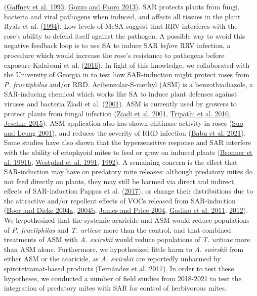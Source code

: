\documentclass{ufdissertation}[overrideChapters] %
\begin{document}
{(\protect\hyperlink{ref-Gaffney1993}{Gaffney et al. 1993}, \protect\hyperlink{ref-Gozzo2013}{Gozzo and Faoro 2013}). SAR protects plants from fungi, bacteria and viral pathogens when induced, and affects all tissues in the plant Ryals et al. (\protect\hyperlink{ref-Ryals1994}{1994}). Low levels of MeSA suggest that RRV interferes with the rose's ability to defend itself against the pathogen. A possible way to avoid this negative feedback loop is to use SA to induce SAR \emph{before} RRV infection, a procedure which would increase the rose's resistance to pathogens before exposure Kalaivani et al. (\protect\hyperlink{ref-Kalaivani2016}{2016}). In light of this knowledge, we collaborated with the University of Georgia in to test how SAR-induction might protect roses from \emph{P. fructiphilus} and/or RRD. Acibenzolar-S-methyl (ASM) is a benzothiadiazole, a SAR-inducing chemical which works like SA to induce plant defenses against viruses and bacteria Ziadi et al. (\protect\hyperlink{ref-Ziadi2001}{2001}). ASM is currently used by growers to protect plants from fungal infection (\protect\hyperlink{ref-Ziadi2001}{Ziadi et al. 2001}, \protect\hyperlink{ref-Tripathi2010}{Tripathi et al. 2010}, \protect\hyperlink{ref-Jeschke2015}{Jeschke 2015}). ASM application also has shown chitinase activity in roses (\protect\hyperlink{ref-Suo2001}{Suo and Leung 2001}), and reduces the severity of RRD infection (\protect\hyperlink{ref-Babu2021}{Babu et al. 2021}). Some studies have also shown that the hypersensitive response and SAR interfere with the ability of eriophyoid mites to feed or grow on induced plants (\protect\hyperlink{ref-Bronner1991a}{Bronner et al. 1991b}, \protect\hyperlink{ref-Westphal1991}{Westphal et al. 1991}, \protect\hyperlink{ref-Westphal1992}{1992}). A remaining concern is the effect that SAR-induction may have on predatory mite releases: although predatory mites do not feed directly on plants, they may still be harmed via direct and indirect effects of SAR-induction Pappas et al. (\protect\hyperlink{ref-Pappas2017}{2017}), or change their distributions due to the attractive and/or repellent effects of VOCs released from SAR-induction (\protect\hyperlink{ref-Boer2004a}{Boer and Dicke 2004a}, \protect\hyperlink{ref-Boer2004b}{2004b}, \protect\hyperlink{ref-James2004}{James and Price 2004}, \protect\hyperlink{ref-Gadino2011}{Gadino et al. 2011}, \protect\hyperlink{ref-Gadino2012}{2012}). We hypothesized that the systemic acaricide and ASM would reduce populations of \emph{P. fructiphilus} and \emph{T. urticae} more than the control, and that combined treatments of ASM with \emph{A. swirskii} would reduce populations of \emph{T. urticae} more than ASM alone. Furthermore, we hypothesized little harm to \emph{A. swirskii} from either ASM or the acaricide, as \emph{A. swirskii} are reportedly unharmed by spirotetramat-based products (\protect\hyperlink{ref-Fernandez2017}{Fernández et al. 2017}). In order to test these hypotheses, we conducted a number of field studies from 2018-2021 to test the integration of predatory mites with SAR for control of herbivorous mites.

}
\end{document}
